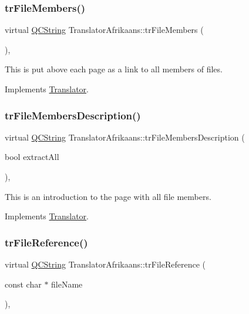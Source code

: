 \subsubsection{\texorpdfstring{trFileMembers()}{trFileMembers()}}
{\footnotesize\ttfamily virtual \mbox{\hyperlink{class_q_c_string}{Q\+C\+String}} Translator\+Afrikaans\+::tr\+File\+Members (\begin{DoxyParamCaption}{ }\end{DoxyParamCaption})\hspace{0.3cm}{\ttfamily [inline]}, {\ttfamily [virtual]}}

This is put above each page as a link to all members of files. 

Implements \mbox{\hyperlink{class_translator}{Translator}}.

\mbox{\label{class_translator_afrikaans_a28c23d74a6212d146e49dfb7935d2d85}} 
\subsubsection{\texorpdfstring{trFileMembersDescription()}{trFileMembersDescription()}}
{\footnotesize\ttfamily virtual \mbox{\hyperlink{class_q_c_string}{Q\+C\+String}} Translator\+Afrikaans\+::tr\+File\+Members\+Description (\begin{DoxyParamCaption}\item[{bool}]{extract\+All }\end{DoxyParamCaption})\hspace{0.3cm}{\ttfamily [inline]}, {\ttfamily [virtual]}}

This is an introduction to the page with all file members. 

Implements \mbox{\hyperlink{class_translator}{Translator}}.

\mbox{\label{class_translator_afrikaans_a5eb35f48a56a8e8f9bc48936d579c418}} 
\subsubsection{\texorpdfstring{trFileReference()}{trFileReference()}}
{\footnotesize\ttfamily virtual \mbox{\hyperlink{class_q_c_string}{Q\+C\+String}} Translator\+Afrikaans\+::tr\+File\+Reference (\begin{DoxyParamCaption}\item[{const char $\ast$}]{file\+Name }\end{DoxyParamCaption})\hspace{0.3cm}{\ttfamily [inline]}, {\ttfamily [virtual]}}

